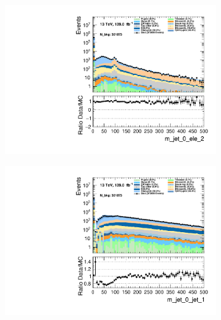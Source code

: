 \begin{figure}
    \centering
    \begin{subfigure}{.49\textwidth}
        \includegraphics[width=\textwidth]{Figures/MC_Data_comp/m_jet_0_ele_2.pdf}
        \caption{}
        \label{fig:et}
    \end{subfigure}
    \hfill
    \begin{subfigure}{.49\textwidth}
        \includegraphics[width=\textwidth]{Figures/MC_Data_comp/m_jet_0_jet_1.pdf}
        \caption{ }
        \label{fig:flcp}
    \end{subfigure}
    \hfill 
    \begin{subfigure}{.49\textwidth}

\end{subfigure}
\end{figure}
